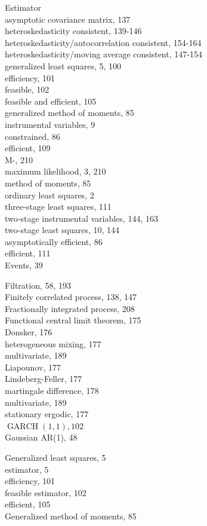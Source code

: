 \documentclass[10pt]{article}
\begin{document}
Estimator\\
asymptotic covariance matrix, 137\\
heteroskedasticity consistent, 139-146\\
heteroskedasticity/autocorrelation consistent, 154-164\\
heteroskedasticity/moving average consistent, 147-154\\
generalized least squares, 5, 100\\
efficiency, 101\\
feasible, 102\\
feasible and efficient, 105\\
generalized method of moments, 85\\
instrumental variables, 9\\
constrained, 86\\
efficient, 109\\
M-, 210\\
maximum likelihood, 3, 210\\
method of moments, 85\\
ordinary least squares, 2\\
three-stage least squares, 111\\
two-stage instrumental variables, 144, 163\\
two-stage least squares, 10, 144\\
asymptotically efficient, 86\\
efficient, 111\\
Events, 39

Filtration, 58, 193\\
Finitely correlated process, 138, 147\\
Fractionally integrated process, 208\\
Functional central limit theorem, 175\\
Donsker, 176\\
heterogeneous mixing, 177\\
multivariate, 189\\
Liapounov, 177\\
Lindeberg-Feller, 177\\
martingale difference, 178\\
multivariate, 189\\
stationary ergodic, 177\\
$\operatorname{GARCH}(1,1), 102$\\
Gaussian AR(1), 48

Generalized least squares, 5\\
estimator, 5\\
efficiency, 101\\
feasible estimator, 102\\
efficient, 105\\
Generalized method of moments, 85
\end{document}
